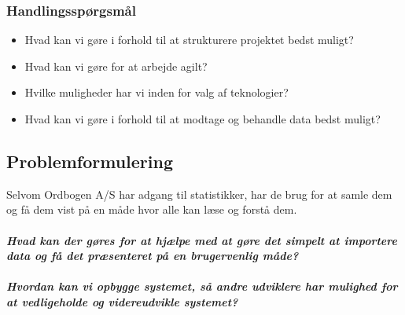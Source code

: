 \subsubsection{Handlingsspørgsmål}
\begin{itemize}
    \item{Hvad kan vi gøre i forhold til at strukturere projektet bedst muligt?}
    \item{Hvad kan vi gøre for at arbejde agilt?}
    \item{Hvilke muligheder har vi inden for valg af teknologier?}
    \item{Hvad kan vi gøre i forhold til at modtage og behandle data bedst muligt?}
\end{itemize}
\subsection{Problemformulering}
Selvom Ordbogen A/S har adgang til statistikker, har de brug for at samle dem og få dem vist på en måde hvor alle kan læse og forstå dem.
\\\\
\textbf{\textit{Hvad kan der gøres for at hjælpe med at gøre det simpelt at importere data og få det præsenteret på en brugervenlig måde?}}
\\\\
\textbf{\textit{Hvordan kan vi opbygge systemet, så andre udviklere har mulighed for at vedligeholde og videreudvikle systemet?}}
